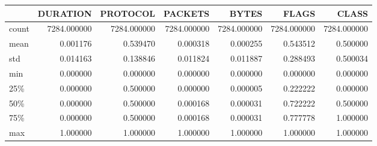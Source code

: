 \begin{tabular}{lrrrrrr}
\toprule
{} &     DURATION &     PROTOCOL &      PACKETS &        BYTES &        FLAGS &        CLASS \\
\midrule
count &  7284.000000 &  7284.000000 &  7284.000000 &  7284.000000 &  7284.000000 &  7284.000000 \\
mean  &     0.001176 &     0.539470 &     0.000318 &     0.000255 &     0.543512 &     0.500000 \\
std   &     0.014163 &     0.138846 &     0.011824 &     0.011887 &     0.288493 &     0.500034 \\
min   &     0.000000 &     0.000000 &     0.000000 &     0.000000 &     0.000000 &     0.000000 \\
25\%   &     0.000000 &     0.500000 &     0.000000 &     0.000005 &     0.222222 &     0.000000 \\
50\%   &     0.000000 &     0.500000 &     0.000168 &     0.000031 &     0.722222 &     0.500000 \\
75\%   &     0.000000 &     0.500000 &     0.000168 &     0.000031 &     0.777778 &     1.000000 \\
max   &     1.000000 &     1.000000 &     1.000000 &     1.000000 &     1.000000 &     1.000000 \\
\bottomrule
\end{tabular}
